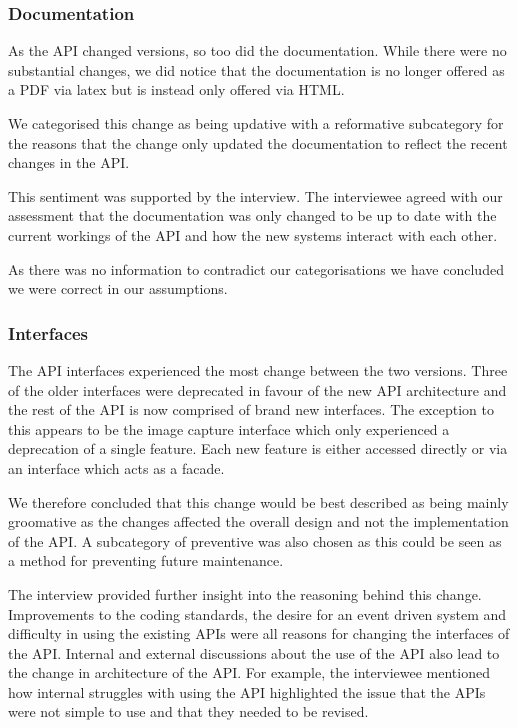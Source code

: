 \documentclass{sig-alternate}
\begin{document}
\subsubsection{Documentation}


As the API changed versions, so too did the documentation. While there were no substantial changes, we did notice that the documentation is no longer offered as a PDF via latex but is instead only offered via HTML. 

We categorised this change as being updative with a reformative subcategory for the reasons that the change only updated the documentation to reflect the recent changes in the API.

This sentiment was supported by the interview. The interviewee agreed with our assessment that the documentation was only changed to be up to date with the current workings of the API and how the new systems interact with each other.

As there was no information to contradict our categorisations we have concluded we were correct in our assumptions.

\subsubsection{Interfaces}

The API interfaces experienced the most change between the two versions. Three of the older interfaces were deprecated in favour of the new API architecture and the rest of the API is now comprised of brand new interfaces. The exception to this appears to be the image capture interface which only experienced a deprecation of a single feature. Each new feature is either accessed directly or via an interface which acts as a facade. 

We therefore concluded that this change would be best described as being mainly groomative as the changes affected the overall design and not the implementation of the API. A subcategory of preventive was also chosen as this could be seen as a method for preventing future maintenance. 

The interview provided further insight into the reasoning behind this change. Improvements to the coding standards, the desire for an event driven system and difficulty in using the existing APIs were all reasons for changing the interfaces of the API. Internal and external discussions about the use of the API also lead to the change in architecture of the API. For example, the interviewee mentioned how internal struggles with using the API highlighted the issue that the APIs were not simple to use and that they needed to be revised.
\end{document}
